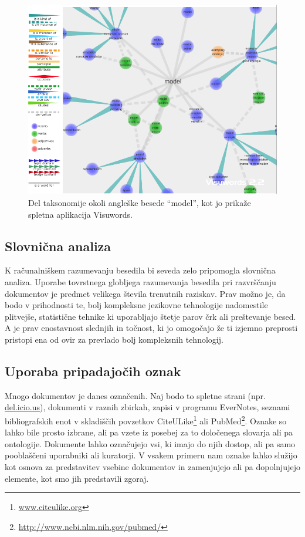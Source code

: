 \begin{figure}[htbp]
\begin{center}
\includegraphics[width=15cm]{slike/visuwords.png}
\caption{Del taksonomije okoli angleške besede ``model'', kot jo
  prikaže spletna aplikacija Visuwords.}
\label{f-visuwords}
\end{center}
\end{figure}


\subsection{Slovnična analiza}

K računalniškem razumevanju besedila bi seveda zelo pripomogla
slovnična analiza. Uporabe tovrstnega globljega razumevanja besedila
pri razvrščanju dokumentov je predmet velikega števila trenutnih
raziskav. Prav možno je, da bodo v prihodnosti te, bolj kompleksne
jezikovne tehnologije nadomestile plitvejše, statistične tehnike ki
uporabljajo štetje parov črk ali preštevanje besed. A je prav
enostavnost slednjih in točnost, ki jo omogočajo že ti izjemno
preprosti pristopi ena od ovir za prevlado bolj kompleksnih
tehnologij.

\subsection{Uporaba pripadajočih oznak}

Mnogo dokumentov je danes označenih. Naj bodo to spletne strani
(npr. \url{del.icio.us}), dokumenti v raznih zbirkah, zapisi v
programu EverNotes, seznami bibliografskih enot v skladiščih povzetkov
CiteULike\footnote{\url{www.citeulike.org}} ali
PubMed\footnote{\url{http://www.ncbi.nlm.nih.gov/pubmed/}}. Oznake so
lahko bile prosto izbrane, ali pa vzete iz posebej za to določenega
slovarja ali pa ontologije. Dokumente lahko označujejo vsi, ki imajo
do njih dostop, ali pa samo pooblaščeni uporabniki ali kuratorji. V
vsakem primeru nam oznake lahko služijo kot osnova za predstavitev
vsebine dokumentov in zamenjujejo ali pa dopolnjujejo elemente, kot
smo jih predstavili zgoraj.

